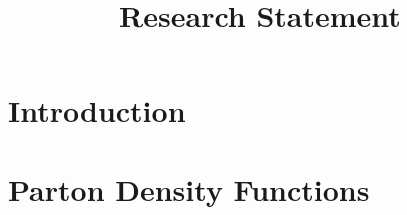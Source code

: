 \documentclass[10pt, a4paper, sans]{moderncv}
\title{Research Statement}
\begin{document}
\makecvtitle


\begin{multicols}{2}

\section{Introduction}
\blindtext\blindtext
\blindtext\blindtext

\section{Parton Density Functions}
\blindtext\blindtext
\blindtext\blindtext
\blindtext\blindtext

\end{multicols}

\makecvfoot
\end{document}
